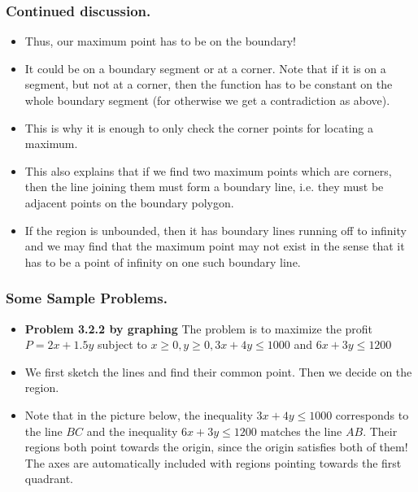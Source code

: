 \begin{frame}%
  \frametitle{Continued discussion.}
  \begin{itemize}%
\item
Thus, our maximum point has to be on the boundary!
\item
It could be on a boundary segment or at a corner.
Note that if it is on a segment, but not at a corner,
then the function has to be constant on the whole boundary segment
(for otherwise we get a contradiction as above).

\item
This is why it is enough to only check the corner points for locating a maximum.
\item
This also explains that if we find two maximum points which are corners,
then the line joining them must form a boundary line,
i.e. they must be adjacent points on the boundary polygon.
\item
If the region is unbounded, then it has boundary lines running
off to infinity and we may find that the maximum point may not
exist in the sense that it has to be a point of infinity on one
such boundary line.
\end{itemize}
\end{frame}
\begin{frame}%
  \frametitle{Some Sample Problems.}
  \begin{itemize}%
\item {\bf Problem 3.2.2 by graphing}
The problem is to maximize the profit $P=2x+1.5y$  
subject to $x\ge 0, y\ge 0, 3x+4y\le 1000$  and  $6x+3y\le 1200$
\item We first sketch the lines and find their common point. 
Then we decide on the region.
\item
Note that in the picture below, the inequality $3x+4y\le  1000$
corresponds to the line $BC$ and the inequality $6x+3y \le 1200$
matches the line $AB$.
Their regions both point towards the origin, since the origin
satisfies both of them!
The axes are automatically included with regions pointing
towards the first quadrant.

 

\end{itemize}
\end{frame}

